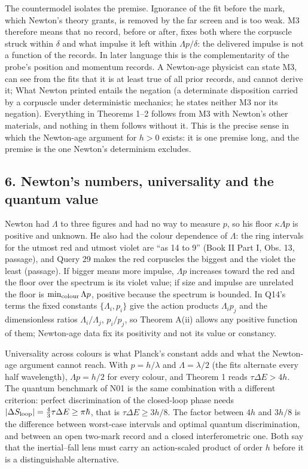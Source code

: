 \documentclass[11pt,a4paper]{article}
\begin{document}
The countermodel isolates the premise. Ignorance of the fit before the
mark, which Newton's theory grants, is removed by the far screen and is
too weak. M3 therefore means that no record, before or after, fixes both
where the corpuscle struck within \(\delta\) and what impulse it left
within \(\Lambda p/\delta\): the delivered impulse is not a function of
the records. In later language this is the complementarity of the
probe's position and momentum records. A Newton-age physicist can state
M3, can see from the fits that it is at least true of all prior records,
and cannot derive it; What Newton printed entails the negation (a
determinate disposition carried by a corpuscle under deterministic
mechanics; he states neither M3 nor its negation). Everything in
Theorems 1--2 follows from M3 with Newton's other materials, and nothing
in them follows without it. This is the precise sense in which the
Newton-age argument for \(h>0\) exists: it is one premise long, and the
premise is the one Newton's determinism excludes.

\hypertarget{newtons-numbers-universality-and-the-quantum-value}{%
\subsection{6. Newton's numbers, universality and the quantum
value}\label{newtons-numbers-universality-and-the-quantum-value}}

Newton had \(\Lambda\) to three figures and had no way to measure \(p\),
so his floor \(\kappa\Lambda p\) is positive and unknown. He also had
the colour dependence of \(\Lambda\): the ring intervals for the utmost
red and utmost violet are ``as 14 to 9'' (Book II Part I, Obs. 13,
passage), and Query 29 makes the red corpuscles the biggest and the
violet the least (passage). If bigger means more impulse, \(\Lambda p\)
increases toward the red and the floor over the spectrum is its violet
value; if size and impulse are unrelated the floor is
\(\min_{\rm colour}\Lambda p\), positive because the spectrum is
bounded. In Q14's terms the fixed constants \(\{\Lambda_i,p_i\}\) give
the action products \(\Lambda_ip_j\) and the dimensionless ratios
\(\Lambda_i/\Lambda_j\), \(p_i/p_j\), so Theorem A(ii) allows any
positive function of them; Newton-age data fix its positivity and not
its value or constancy.

Universality across colours is what Planck's constant adds and what the
Newton-age argument cannot reach. With \(p=h/\lambda\) and
\(\Lambda=\lambda/2\) (the fits alternate every half wavelength),
\(\Lambda p=h/2\) for every colour, and Theorem 1 reads
\(\tau\Delta E>4h\). The quantum benchmark of N01 is the same
combination with a different criterion: perfect discrimination of the
closed-loop phase needs
\(|\Delta S_{\rm loop}|=\tfrac43\tau\Delta E\ge\pi\hbar\), that is
\(\tau\Delta E\ge3h/8\). The factor between \(4h\) and \(3h/8\) is the
difference between worst-case intervals and optimal quantum
discrimination, and between an open two-mark record and a closed
interferometric one. Both say that the inertial--fall lens must carry an
action-scaled product of order \(h\) before it is a distinguishable
alternative.
\end{document}
